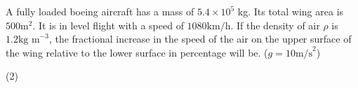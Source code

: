 \item A fully loaded boeing aircraft has a mass of \(5.4 \times 10^5\) kg. Its total wing area is \(500 \textrm{m}^2\). It is in level flight with a speed of \(1080\textrm{km/h}\). If the density of air \(\rho\) is \(1.2 \textrm{kg m}^{-3}\), the fractional increase in the speed of the air on the upper surface of the wing relative to the lower surface in percentage will be. (\(g = 10 \textrm{m/s}^2\))
    \begin{tasks}(2)
    \end{tasks}